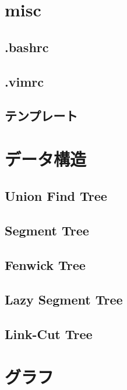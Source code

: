 \documentclass[landscape,twocolumn,9pt]{jsarticle}
\begin{document}
\section{misc}

\subsection{.bashrc}

\subsection{.vimrc}

\subsection{テンプレート}


\section{データ構造}

\subsection{Union Find Tree}

\subsection{Segment Tree}

\subsection{Fenwick Tree}

\subsection{Lazy Segment Tree}

\subsection{Link-Cut Tree}


\section{グラフ}


\end{document}
